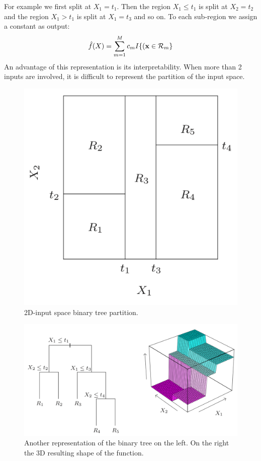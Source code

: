 \documentclass[12pt, letterpaper]{article}
\theoremstyle{definition}
\newcommand{\x}{\mathbf{x}}
\begin{document}
For example we first split at $X_1 = t_1$. Then the region $X_1 \le t_1$ is split at $X_2 =t_2$ and the region $X_1 >t_1$ is split at $X_1 =t_3$ and so on. To each sub-region we assign a constant as output:
\begin{equation}
\hat{f}(X) = \sum_{m=1}^M c_m I\{(\x \in \CMcal{R}_m\}
\end{equation}
An advantage of this representation is its interpretability. When more than 2 inputs are involved, it is difficult to represent the partition of the input space. 
\begin{figure}
\includegraphics[scale=0.4]{img/tree1}
\caption{2D-input space binary tree partition.}
\label{tree1}
\end{figure}
\begin{figure}
\includegraphics[scale=0.39]{img/tree2}
\caption{Another representation of the binary tree on the left. On the right the 3D resulting shape of the function.}
\label{tree2}
\end{figure}
\end{document}

